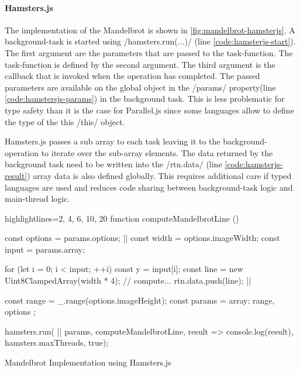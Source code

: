 \paragraph{Hamsters.js}
The implementation of the Mandelbrot is shown in \cref{fig:mandelbrot-hamsterjs}. A background-task is started using \javascriptinline/hamsters.run(...)/ (line \ref{code:hamsterjs-start}). The first argument are the parameters that are passed to the task-function. The task-function is defined by the second argument. The third argument is the callback that is invoked when the operation has completed. The passed parameters are available on the global object in the \javascriptinline/params/ property(line \ref{code:hamstersjs-params}) in the background task. This is less problematic for type safety than it is the case for Parallel.js since some languages allow to define the type of the this \javascriptinline/this/ object. 

Hamsters.js passes a sub array to each task leaving it to the background-operation to iterate over the sub-array elements. The data returned by the background task need to be written into the \javascriptinline/rtn.data/ (line \ref{code:hamsterjs-result}) array data is also defined globally. This requires additional care if typed languages are used and reduces code sharing between background-task logic and main-thread logic.

\begin{listing}
\begin{javascriptcode*}{highlightlines={2, 4, 6, 10, 20}}
function computeMandelbrotLine () {
	const options = params.options; |$\label{code:hamstersjs-params}$|
	const width = options.imageWidth;
	const input = params.array;

	for (let i = 0; i < input; ++i) {
		const y = input[i];
		const line = new Uint8ClampedArray(width * 4);
		// compute...
		rtn.data.push(line); |$\label{code:hamsterjs-result}$|
	}
}

const range = _.range(options.imageHeight);
const params = {
	array: range,
	options
};

hamsters.run( |$\label{code:hamsterjs-start}$|
	params,  
	computeMandelbrotLine, 
	result => console.log(result), 
	hamsters.maxThreads, 
	true);
\end{javascriptcode*}
\caption{Mandelbrot Implementation using Hamsters.js}
\label{fig:mandelbrot-hamsterjs}
\end{listing}


